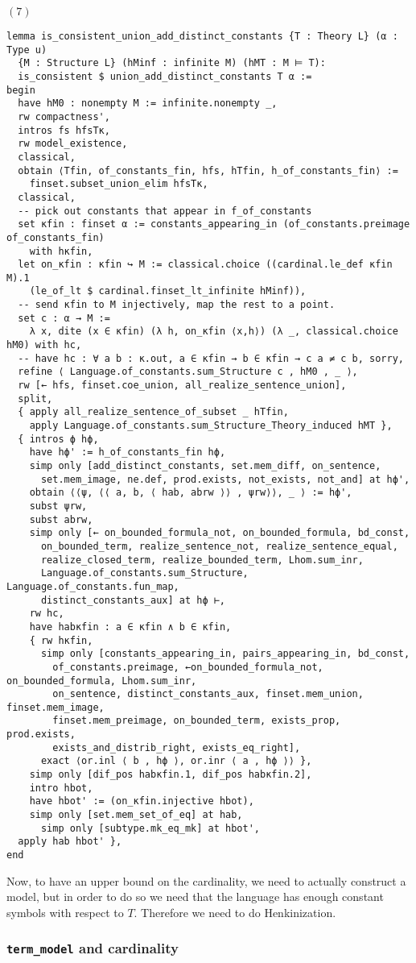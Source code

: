 \documentclass{article}
\newcommand{\<}{\langle}
\renewcommand{\>}{\rangle}
\theoremstyle{definitionstyle}
\theoremstyle{exercisestyle}
\theoremstyle{remarkstyle}
\begin{document}
$(7)$

\begin{lstlisting}
lemma is_consistent_union_add_distinct_constants {T : Theory L} (α : Type u)
  {M : Structure L} (hMinf : infinite M) (hMT : M ⊨ T):
  is_consistent $ union_add_distinct_constants T α :=
begin
  have hM0 : nonempty M := infinite.nonempty _,
  rw compactness',
  intros fs hfsTκ,
  rw model_existence,
  classical,
  obtain ⟨Tfin, of_constants_fin, hfs, hTfin, h_of_constants_fin⟩ :=
    finset.subset_union_elim hfsTκ,
  classical,
  -- pick out constants that appear in f_of_constants
  set κfin : finset α := constants_appearing_in (of_constants.preimage of_constants_fin)
    with hκfin,
  let on_κfin : κfin ↪ M := classical.choice ((cardinal.le_def κfin M).1
    (le_of_lt $ cardinal.finset_lt_infinite hMinf)),
  -- send κfin to M injectively, map the rest to a point.
  set c : α → M :=
    λ x, dite (x ∈ κfin) (λ h, on_κfin ⟨x,h⟩) (λ _, classical.choice hM0) with hc,
  -- have hc : ∀ a b : κ.out, a ∈ κfin → b ∈ κfin → c a ≠ c b, sorry,
  refine ⟨ Language.of_constants.sum_Structure c , hM0 , _ ⟩,
  rw [← hfs, finset.coe_union, all_realize_sentence_union],
  split,
  { apply all_realize_sentence_of_subset _ hTfin,
    apply Language.of_constants.sum_Structure_Theory_induced hMT },
  { intros ϕ hϕ,
    have hϕ' := h_of_constants_fin hϕ,
    simp only [add_distinct_constants, set.mem_diff, on_sentence,
      set.mem_image, ne.def, prod.exists, not_exists, not_and] at hϕ',
    obtain ⟨⟨ψ, ⟨⟨ a, b, ⟨ hab, abrw ⟩⟩ , ψrw⟩⟩, _ ⟩ := hϕ',
    subst ψrw,
    subst abrw,
    simp only [← on_bounded_formula_not, on_bounded_formula, bd_const,
      on_bounded_term, realize_sentence_not, realize_sentence_equal,
      realize_closed_term, realize_bounded_term, Lhom.sum_inr,
      Language.of_constants.sum_Structure, Language.of_constants.fun_map,
      distinct_constants_aux] at hϕ ⊢,
    rw hc,
    have habκfin : a ∈ κfin ∧ b ∈ κfin,
    { rw hκfin,
      simp only [constants_appearing_in, pairs_appearing_in, bd_const,
        of_constants.preimage, ←on_bounded_formula_not, on_bounded_formula, Lhom.sum_inr,
        on_sentence, distinct_constants_aux, finset.mem_union, finset.mem_image,
        finset.mem_preimage, on_bounded_term, exists_prop, prod.exists,
        exists_and_distrib_right, exists_eq_right],
      exact ⟨or.inl ⟨ b , hϕ ⟩, or.inr ⟨ a , hϕ ⟩⟩ },
    simp only [dif_pos habκfin.1, dif_pos habκfin.2],
    intro hbot,
    have hbot' := (on_κfin.injective hbot),
    simp only [set.mem_set_of_eq] at hab,
      simp only [subtype.mk_eq_mk] at hbot',
  apply hab hbot' },
end
\end{lstlisting}

Now, to have an upper bound on the cardinality,
we need to actually construct a model,
but in order to do so we need that the language has enough
constant symbols with respect to $T$.
Therefore we need to do Henkinization.

\subsubsection{\texttt{term\_model} and cardinality}


{}

\end{document}
